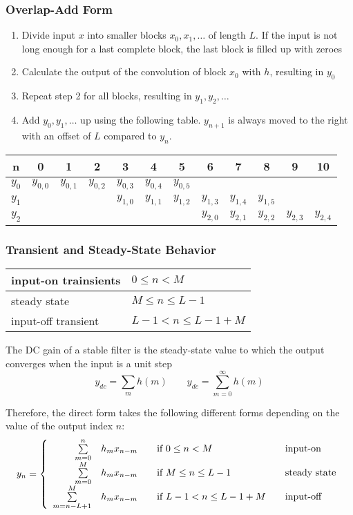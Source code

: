 \subsubsection{Overlap-Add Form}
\begin{enumerate}
  \item Divide input $x$ into smaller blocks $x_0, x_1, \ldots$ of length $L$.
  If the input is not long enough for a last complete block, the last block is
  filled up with zeroes
  \item Calculate the output of the convolution of block $x_0$ with $h$,
  resulting in $y_0$
  \item Repeat step 2 for all blocks, resulting in $y_1, y_2, \ldots$
  \item Add $y_0, y_1, \ldots$ up using the following table. $y_{n+1}$ is always
  moved to the right with an offset of $L$ compared to $y_n$.
\end{enumerate}

\begin{tabular}{c|ccccccccccc}
	n & 0 & 1 & 2 & 3 & 4 & 5 & 6 & 7 & 8 & 9 & 10 \\
	\hline
	$y_0$ & $y_{0,0}$ & $y_{0,1}$ & $y_{0,2}$ & $y_{0,3}$ & $y_{0,4}$ & $y_{0,5}$ &
	& & & &\\
	$y_1$ & & & & $y_{1,0}$ & $y_{1,1}$ & $y_{1,2}$ & $y_{1,3}$ & $y_{1,4}$ &
	$y_{1,5}$ & & \\
	$y_2$ & & & & & & & $y_{2,0}$ & $y_{2,1}$ & $y_{2,2}$ & $y_{2,3}$ & $y_{2,4}$
	\\
	\hline
\end{tabular}


\subsubsection{Transient and Steady-State Behavior}

\begin{tabular}{|l|l|}
	\hline
	input-on trainsients	& $ 0 \leq n < M $
	\\ \hline
	steady state			& $ M \leq n \leq L-1 $
	\\ \hline
	input-off transient		& $ L-1 < n \leq L-1+M $
	\\ \hline
\end{tabular}\newline
The DC gain of a stable filter is the steady-state value to which the output converges when the input is a unit step
\[ y_{dc} = \sum_{m}^{} h(m) \qquad y_{dc}=\sum_{m=0}^{\infty}h(m) \]


Therefore, the direct form takes the following different forms depending
on the value of the output index $n$:
\[
	y_n =
		\left\{
			\begin{array}{r l l l}
				\sum\limits_{m=0}^{n} & h_m x_{n-m}		& \quad \text{if } 0 \leq n < M			& \quad \text{input-on} \\
				\sum\limits_{m=0}^{M} & h_m x_{n-m}		& \quad \text{if } M \leq n \leq L-1	& \quad \text{steady state} \\
				\sum\limits_{m=n-L+1}^{M} & h_m x_{n-m}	& \quad \text{if } L-1 < n \leq L-1+M	& \quad \text{input-off}
			\end{array}
		\right.
\]


